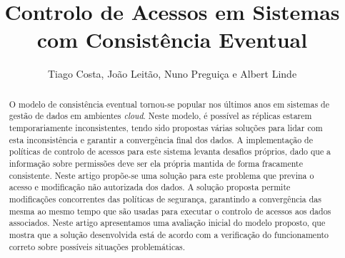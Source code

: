 \documentclass[runningheads,a4paper]{llncs}
\begin{document}


\title{Controlo de Acessos em Sistemas com Consistência Eventual}

\author{Tiago Costa, João Leitão, Nuno Preguiça e Albert Linde}


%

			
\maketitle

\begin{abstract}
O modelo de consistência eventual tornou-se popular nos últimos anos em sistemas de gestão de dados em ambientes \textit{cloud}. Neste modelo, é possível as réplicas estarem temporariamente inconsistentes, tendo sido propostas várias soluções para lidar com esta inconsistência e garantir a convergência final dos dados. 
A implementação de políticas de controlo de acessos para este sistema levanta desafios próprios, dado que a informação sobre permissões deve ser ela própria mantida de forma fracamente consistente. Neste artigo propõe-se uma solução para este problema que previna o acesso e modificação não autorizada dos dados. A solução proposta permite modificações concorrentes das políticas de segurança, garantindo a convergência das mesma ao mesmo tempo que são usadas para executar o controlo de acessos aos dados associados. 
Neste artigo apresentamos uma avaliação inicial do modelo proposto, que mostra que a solução desenvolvida está de acordo com a verificação do funcionamento correto sobre possíveis situações problemáticas.
\end{abstract}
\end{document}
